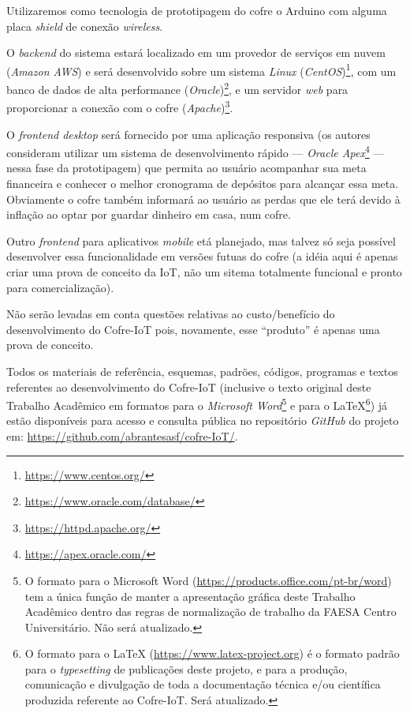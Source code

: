 \documentclass[pdftex, brazil, 12pt, twoside]{article}
\newcommand{\ingles}[1]{\textit{#1}}
\begin{document}
Utilizaremos como tecnologia de prototipagem do cofre o Arduino com alguma
placa \ingles{shield} de conexão \ingles{wireless}.

O \ingles{backend} do sistema estará localizado em um provedor de serviços em nuvem
(\ingles{Amazon AWS}) e será desenvolvido sobre um sistema \ingles{Linux} (\ingles{CentOS})\footnote{\url{https://www.centos.org/}},
com um banco de dados de alta performance (\ingles{Oracle})\footnote{\url{https://www.oracle.com/database/}},
e um servidor \ingles{web} para proporcionar a conexão com o cofre (\ingles{Apache})\footnote{\url{https://httpd.apache.org/}}.

O \ingles{frontend desktop} será fornecido por uma aplicação responsiva (os autores
consideram utilizar um sistema de desenvolvimento rápido --- \ingles{Oracle Apex}\footnote{\url{https://apex.oracle.com/}} ---
nessa fase da prototipagem) que permita ao usuário acompanhar sua meta financeira
e conhecer o melhor cronograma de depósitos para alcançar essa meta.
Obviamente o cofre também informará ao usuário as perdas que ele terá devido
à inflação ao optar por guardar dinheiro em casa, num cofre.

Outro \ingles{frontend} para aplicativos \ingles{mobile} etá planejado, mas talvez
só seja possível desenvolver essa funcionalidade em versões futuas do cofre
(a idéia aqui é apenas criar uma prova de conceito da IoT, não um sitema
totalmente funcional e pronto para comercialização).

Não serão levadas em conta questões relativas ao custo/benefício do desenvolvimento
do Cofre-IoT pois, novamente, esse ``produto'' é apenas uma prova de conceito.

Todos os materiais de referência, esquemas, padrões, códigos, programas e textos
referentes ao desenvolvimento do Cofre-IoT (inclusive o texto original deste Trabalho
Acadêmico em formatos para o \ingles{Microsoft Word}\footnote{O formato para o Microsoft Word
  (\url{https://products.office.com/pt-br/word}) tem a única função de manter a apresentação
  gráfica deste Trabalho Acadêmico dentro das regras de normalização de trabalho
  da FAESA Centro Universitário. Não será atualizado.} e para o \LaTeX\footnote{O formato para o \LaTeX
  (\url{https://www.latex-project.org}) é o formato padrão para o \ingles{typesetting} de publicações
  deste projeto, e para a produção, comunicação e divulgação de toda a documentação
  técnica e/ou científica produzida referente ao Cofre-IoT. Será atualizado.}) já estão disponíveis
para acesso e consulta pública no repositório \ingles{GitHub} do projeto em:
\url{https://github.com/abrantesasf/cofre-IoT/}.
\end{document}
